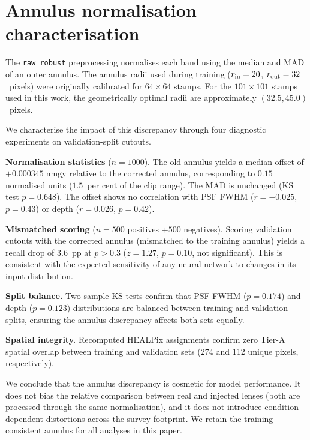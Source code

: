 \documentclass[fleqn,usenatbib]{mnras}
\begin{document}
\appendix
\section{Annulus normalisation characterisation}
\label{app:annulus}

The \texttt{raw\_robust} preprocessing normalises each band using the median and MAD of an outer annulus.  The annulus radii used during training ($r_{\rm in} = 20$, $r_{\rm out} = 32$~pixels) were originally calibrated for $64 \times 64$ stamps.  For the $101 \times 101$ stamps used in this work, the geometrically optimal radii are approximately $(32.5, 45.0)$~pixels.

We characterise the impact of this discrepancy through four diagnostic experiments on validation-split cutouts.

\textbf{Normalisation statistics} ($n = 1000$).  The old annulus yields a median offset of $+0.000345\;\mathrm{nmgy}$ relative to the corrected annulus, corresponding to $0.15$ normalised units ($1.5$~per cent of the clip range).  The MAD is unchanged (KS test $p = 0.648$).  The offset shows no correlation with PSF FWHM ($r = -0.025$, $p = 0.43$) or depth ($r = 0.026$, $p = 0.42$).

\textbf{Mismatched scoring} ($n = 500$ positives $+ 500$ negatives).  Scoring validation cutouts with the corrected annulus (mismatched to the training annulus) yields a recall drop of $3.6$~pp at $p > 0.3$ ($z = 1.27$, $p = 0.10$, not significant).  This is consistent with the expected sensitivity of any neural network to changes in its input distribution.

\textbf{Split balance.}  Two-sample KS tests confirm that PSF FWHM ($p = 0.174$) and depth ($p = 0.123$) distributions are balanced between training and validation splits, ensuring the annulus discrepancy affects both sets equally.

\textbf{Spatial integrity.}  Recomputed HEALPix assignments confirm zero Tier-A spatial overlap between training and validation sets (274 and 112 unique pixels, respectively).

We conclude that the annulus discrepancy is cosmetic for model performance.  It does not bias the relative comparison between real and injected lenses (both are processed through the same normalisation), and it does not introduce condition-dependent distortions across the survey footprint.  We retain the training-consistent annulus for all analyses in this paper.
\end{document}
